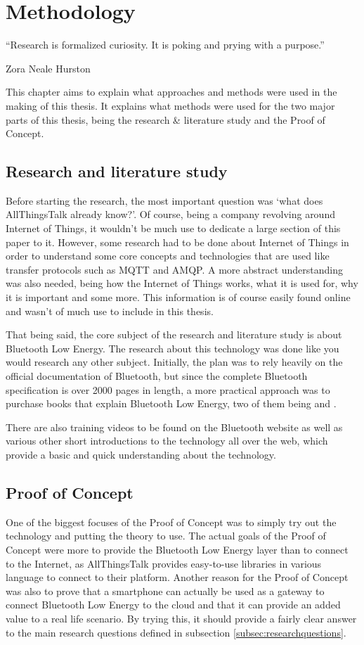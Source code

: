 \documentclass[pdftex,a4paper,12pt,twoside]{report}
\begin{document}
\chapter{Methodology}
\label{ch:methodology}
\epigraph{``Research is formalized curiosity. It is poking and prying with a purpose.''}{Zora Neale Hurston}
This chapter aims to explain what approaches and methods were used in the making of this thesis. It explains what methods were used for the two major parts of this thesis, being the research \& literature study and the Proof of Concept.

\section{Research and literature study}
\label{sec:researchlit}
Before starting the research, the most important question was `what does AllThingsTalk already know?'. Of course, being a company revolving around Internet of Things, it wouldn't be much use to dedicate a large section of this paper to it. However, some research had to be done about Internet of Things in order to understand some core concepts and technologies that are  used like transfer protocols such as MQTT and AMQP. A more abstract understanding was also needed, being how the Internet of Things works, what it is used for, why it is important and some more. This information is of course easily found online and wasn't of much use to include in this thesis.

That being said, the core subject of the research and literature study is about Bluetooth Low Energy. The research about this technology was done like you would research any other subject. Initially, the plan was to rely heavily on the official documentation of Bluetooth, but since the complete Bluetooth specification is over 2000 pages in length, a more practical approach was to purchase books that explain Bluetooth Low Energy, two of them being \cite{Townsend2014} and \cite{heydon2012bluetooth}.

There are also training videos to be found on the Bluetooth website as well as various other short introductions to the technology all over the web, which provide a basic and quick understanding about the technology.

\section{Proof of Concept}
\label{sec:poc}
One of the biggest focuses of the Proof of Concept was to simply try out the technology and putting the theory to use. The actual goals of the Proof of Concept were more to provide the Bluetooth Low Energy layer than to connect to the Internet, as AllThingsTalk provides easy-to-use libraries in various language to connect to their platform. Another reason for the Proof of Concept was also to prove that a smartphone can actually be used as a gateway to connect Bluetooth Low Energy to the cloud and that it can provide an added value to a real life scenario. By trying this, it should provide a fairly clear answer to the main research questions defined in subsection \ref{subsec:researchquestions}.
\end{document}
